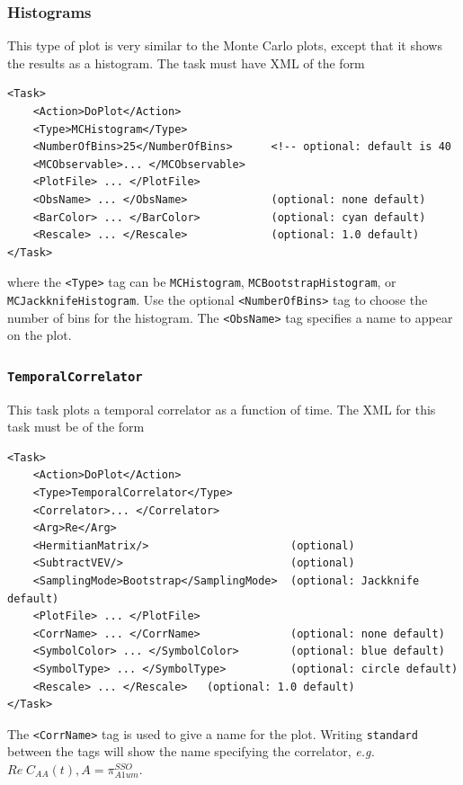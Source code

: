 \documentclass[12pt]{article}
\newcommand{\vb}{\texttt}
\begin{document}
\subsubsection{Histograms}
This type of plot is very similar to the Monte Carlo plots, except that it shows the results
as a histogram. The task must have XML of the form
\begin{verbatim}
<Task>
    <Action>DoPlot</Action>
    <Type>MCHistogram</Type>
    <NumberOfBins>25</NumberOfBins>      <!-- optional: default is 40
    <MCObservable>... </MCObservable>
    <PlotFile> ... </PlotFile>
    <ObsName> ... </ObsName>             (optional: none default)
    <BarColor> ... </BarColor>           (optional: cyan default)
    <Rescale> ... </Rescale>             (optional: 1.0 default)
</Task>
\end{verbatim}
where the \vb{<Type>} tag can be  \vb{MCHistogram}, \vb{MCBootstrapHistogram}, or
\newline\vb{MCJackknifeHistogram}. Use the optional \vb{<NumberOfBins>} tag to
choose the number of bins for the histogram.
The \vb{<ObsName>} tag specifies a name to appear on the plot.

\subsubsection{\vb{TemporalCorrelator}}

This task plots a temporal correlator as a function of time. The XML for this task must be 
of the form
\begin{verbatim}
<Task>
    <Action>DoPlot</Action>
    <Type>TemporalCorrelator</Type>
    <Correlator>... </Correlator>
    <Arg>Re</Arg>
    <HermitianMatrix/>                      (optional)
    <SubtractVEV/>                          (optional)
    <SamplingMode>Bootstrap</SamplingMode>  (optional: Jackknife default)
    <PlotFile> ... </PlotFile>
    <CorrName> ... </CorrName>              (optional: none default)
    <SymbolColor> ... </SymbolColor>        (optional: blue default)
    <SymbolType> ... </SymbolType>          (optional: circle default)
    <Rescale> ... </Rescale>   (optional: 1.0 default)
</Task>
\end{verbatim}
The \vb{<CorrName>} tag is used to give a name for the plot.
Writing \vb{standard} between the tags will show the name specifying the correlator,
\textit{e.g.} $Re \; C_{AA}(t), A = \pi_{A1um}^{SSO}$.
\end{document}
